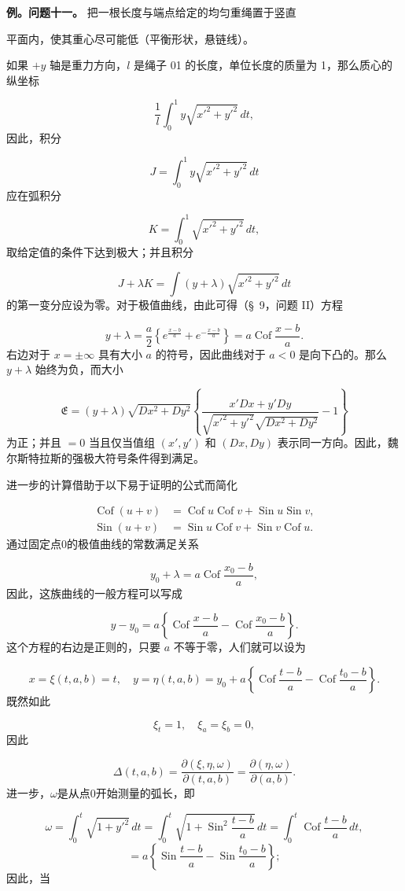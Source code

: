 \documentclass[11pt,a4paper,leqno]{article}
\newcommand{\Cof}{\operatorname{Cof}}
\newcommand{\Sin}{\operatorname{Sin}}
\begin{document}
\noindent\textbf{例。问题十一。} 把一根长度与端点给定的均匀重绳置于竖直

平面内，使其重心尽可能低（平衡形状，悬链线）。

如果 $+y$ 轴是重力方向，$l$ 是绳子 01 的长度，单位长度的质量为 1，那么质心的纵坐标

\[
\frac{1}{l}\int_0^1 y\sqrt{x'^2+y'^2}\,dt,
\]
因此，积分

\[
J=\int_0^1 y\sqrt{x'^2+y'^2}\,dt
\]
应在弧积分

\[
K=\int_0^1 \sqrt{x'^2+y'^2}\,dt,
\]
取给定值的条件下达到极大；并且积分

\[
J+\lambda K=\int (y+\lambda)\sqrt{x'^2+y'^2}\,dt
\]
的第一变分应设为零。对于极值曲线，由此可得（\S~9，问题 II）方程

\[
y+\lambda=\frac{a}{2}\left\{e^{\frac{x-b}{a}}+e^{-\frac{x-b}{a}}\right\}=a\Cof\frac{x-b}{a}.
\]
右边对于 $x=\pm\infty$ 具有大小 $a$ 的符号，因此曲线对于 $a<0$ 是向下凸的。那么 $y+\lambda$ 始终为负，而大小

\[
\mathfrak{E}=(y+\lambda)\sqrt{Dx^2+Dy^2}\left\{\frac{x'Dx+y'Dy}{\sqrt{x'^2+y'^2}\sqrt{Dx^2+Dy^2}}-1\right\}
\]
为正；并且 $=0$ 当且仅当值组 $(x',y')$ 和 $(Dx,Dy)$ 表示同一方向。因此，魏尔斯特拉斯的强极大符号条件得到满足。

进一步的计算借助于以下易于证明的公式而简化

\begin{equation}\tag{23}
\begin{aligned}
\Cof(u+v)&=\Cof u\Cof v+\Sin u\Sin v,\\
\Sin(u+v)&=\Sin u\Cof v+\Sin v\Cof u.
\end{aligned}
\end{equation}
通过固定点0的极值曲线的常数满足关系

\[
y_0+\lambda=a\Cof\frac{x_0-b}{a},
\]
因此，这族曲线的一般方程可以写成

\[
y-y_0=a\left\{\Cof\frac{x-b}{a}-\Cof\frac{x_0-b}{a}\right\}.
\]
这个方程的右边是正则的，只要 $a$ 不等于零，人们就可以设为

\[
x=\xi(t,a,b)=t,\quad y=\eta(t,a,b)=y_0+a\left\{\Cof\frac{t-b}{a}-\Cof\frac{t_0-b}{a}\right\}.
\]
既然如此

\[
\xi_t=1,\quad \xi_a=\xi_b=0,
\]
因此

\[
\Delta(t,a,b)=\frac{\partial(\xi,\eta,\omega)}{\partial(t,a,b)}=\frac{\partial(\eta,\omega)}{\partial(a,b)}.
\]
进一步，$\omega$是从点0开始测量的弧长，即

\[
\omega=\int_0^t\sqrt{1+y'^2}\,dt=\int_0^t\sqrt{1+\Sin^2\frac{t-b}{a}}\,dt
=\int_0^t \Cof\frac{t-b}{a}\,dt,
\]
\[
=a\left\{\Sin\frac{t-b}{a}-\Sin\frac{t_0-b}{a}\right\};
\]
因此，当
\end{document}
